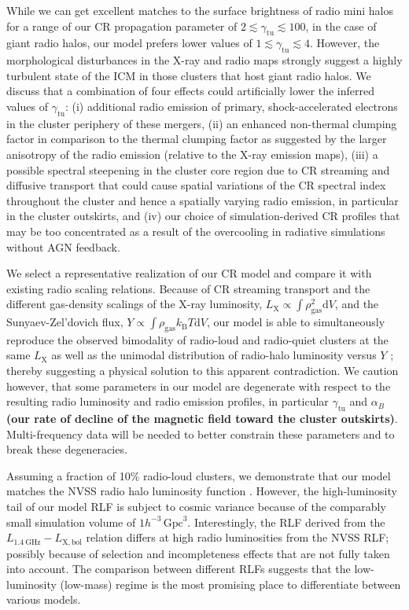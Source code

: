 \documentclass[traditabstract]{aa}
\def\C#1{{\bf #1}}
\newcommand{\rmn}{\mathrm}
\newcommand{\dd}{\mathrm{d}}
\begin{document}
While we can get excellent matches to the surface brightness of radio mini halos
for a range of our CR propagation parameter of
$2\lesssim\gamma_{\rmn{tu}}\lesssim100$, in the case of giant radio halos, our
model prefers lower values of $1\lesssim\gamma_{\rmn{tu}}\lesssim4$. However, the
morphological disturbances in the X-ray and radio maps strongly suggest a highly
turbulent state of the ICM in those clusters that host giant radio halos. We
discuss that a combination of four effects could artificially lower the inferred
values of $\gamma_{\rmn{tu}}$: (i) additional radio emission of primary,
shock-accelerated electrons in the cluster periphery of these mergers, (ii) an
enhanced non-thermal clumping factor in comparison to the thermal clumping
factor as suggested by the larger anisotropy of the radio emission (relative to
the X-ray emission maps), (iii) a possible spectral steepening in the cluster
core region due to CR streaming and diffusive transport that could cause spatial
variations of the CR spectral index throughout the cluster and hence a spatially
varying radio emission, in particular in the cluster outskirts, and (iv) our
choice of simulation-derived CR profiles that may be too concentrated as a
result of the overcooling in radiative simulations without AGN feedback.

We select a representative realization of our CR model and compare it with
existing radio scaling relations.  Because of CR streaming transport and the
different gas-density scalings of the X-ray luminosity, $L_{\rmn{X}}\propto\int
\rho_\rmn{gas}^2 \dd V$, and the Sunyaev-Zel'dovich flux, $Y\propto\int
\rho_{\rmn{gas}} k_{\rmn{B}} T \dd V$, our model is able to simultaneously
reproduce the observed bimodality of radio-loud and radio-quiet clusters at the
same $L_{\rmn{X}}$ \citep{2009A&A...507..661B,2011A&A...527A..99E} as well as
the unimodal distribution of radio-halo luminosity versus $Y$
\citep{2012MNRAS.421L.112B}; thereby suggesting a physical solution to this
apparent contradiction. We caution however, that some parameters in our model
are degenerate with respect to the resulting radio luminosity and radio emission
profiles, in particular $\gamma_{\rmn{tu}}$ and $\alpha_B$ \C{(our rate of decline
of the magnetic field toward the cluster outskirts)}. Multi-frequency data will be
needed to better constrain these parameters and to break these degeneracies.

Assuming a fraction of 10\% radio-loud clusters, we demonstrate that our model
matches the NVSS radio halo luminosity function
\citep[RLF,][]{1999NewA....4..141G}. However, the high-luminosity tail of our
model RLF is subject to cosmic variance because of the comparably small
simulation volume of $1 h^{-3}\,\rmn{Gpc}^3$. Interestingly, the RLF derived
from the $L_{1.4~\rmn{GHz}}-L_{\rmn{X,bol}}$ relation differs at high radio
luminosities from the NVSS RLF; possibly because of selection and incompleteness
effects that are not fully taken into account. The comparison between different
RLFs suggests that the low-luminosity (low-mass) regime is the most promising
place to differentiate between various models.
\end{document}
